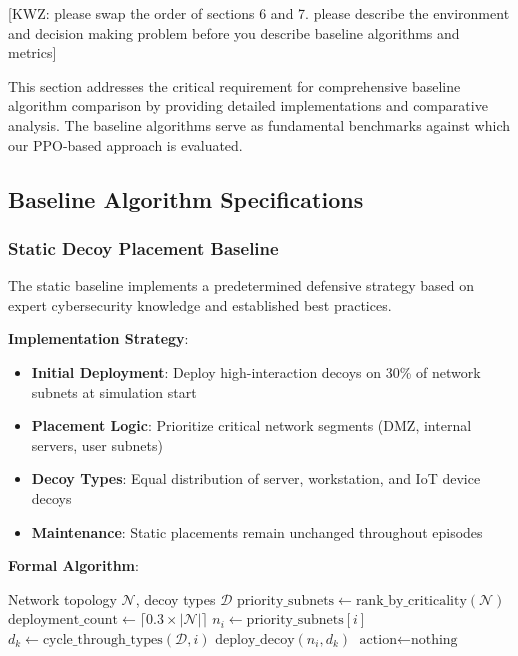 \documentclass[12pt,oneside]{article}
\newcommand{\kwz}[1]{
  {\color{magenta} [KWZ: {#1}]}
 }
\begin{document}
\kwz{please swap the order of sections 6 and 7. please describe the environment and decision making problem before you describe baseline algorithms and metrics}

This section addresses the critical requirement for comprehensive baseline algorithm comparison by providing detailed implementations and comparative analysis. The baseline algorithms serve as fundamental benchmarks against which our PPO-based approach is evaluated.

\subsection{Baseline Algorithm Specifications}

\subsubsection{Static Decoy Placement Baseline}

The static baseline implements a predetermined defensive strategy based on expert cybersecurity knowledge and established best practices.

\textbf{Implementation Strategy}:
\begin{itemize}
    \item \textbf{Initial Deployment}: Deploy high-interaction decoys on 30\% of network subnets at simulation start
    \item \textbf{Placement Logic}: Prioritize critical network segments (DMZ, internal servers, user subnets)
    \item \textbf{Decoy Types}: Equal distribution of server, workstation, and IoT device decoys
    \item \textbf{Maintenance}: Static placements remain unchanged throughout episodes
\end{itemize}

\textbf{Formal Algorithm}:
\begin{algorithm}[H]
\caption{Static Decoy Placement Baseline}
\label{alg:static_baseline}
\begin{algorithmic}[1]
\REQUIRE Network topology $\mathcal{N}$, decoy types $\mathcal{D}$
\STATE $\text{priority\_subnets} \leftarrow \text{rank\_by\_criticality}(\mathcal{N})$
\STATE $\text{deployment\_count} \leftarrow \lceil 0.3 \times |\mathcal{N}| \rceil$
    \STATE $n_i \leftarrow \text{priority\_subnets}[i]$
    \STATE $d_k \leftarrow \text{cycle\_through\_types}(\mathcal{D}, i)$
    \STATE $\text{deploy\_decoy}(n_i, d_k)$
\ENDFOR
{}
    \STATE $\text{action} \leftarrow \text{nothing}$ 
\ENDWHILE
\end{algorithmic}
\end{algorithm}
\end{document}
